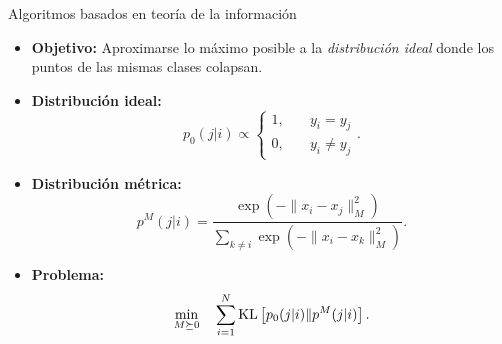 \documentclass[10pt, compress]{beamer}
\begin{document}
\begin{frame}{Algoritmos basados en teoría de la información}
\begin{minipage}[t][\textheight][t]{0.31\textwidth}
{\begin{minipage}[t][\textheight][t]{1.66\textwidth}
  \begin{itemize}
    \item \textbf{Objetivo:} Aproximarse lo máximo posible a la \textit{distribución ideal} donde los puntos de las mismas clases colapsan.
    \item \textbf{Distribución ideal:}
    \[p_0(j|i) \propto \begin{cases}1, &\quad y_i = y_j \\ 0, &\quad y_i \ne y_j\end{cases}. \]
    \item \textbf{Distribución métrica:}
    \[p^{M}(j|i) = \frac{\exp(-\|x_i-x_j\|^2_M)}{\sum\limits_{k\ne i} \exp(-\|x_i-x_k\|^2_M)}.\]
    \item \textbf{Problema:}
    \[\min_{M \succeq 0}\quad \sum_{i=1}^N \operatorname{KL} \left[ p_0(j|i) \| p^M(j|i) \right]. \]
  \end{itemize}


  \end{minipage}
  }

  \end{minipage}
\end{frame}
\end{document}
